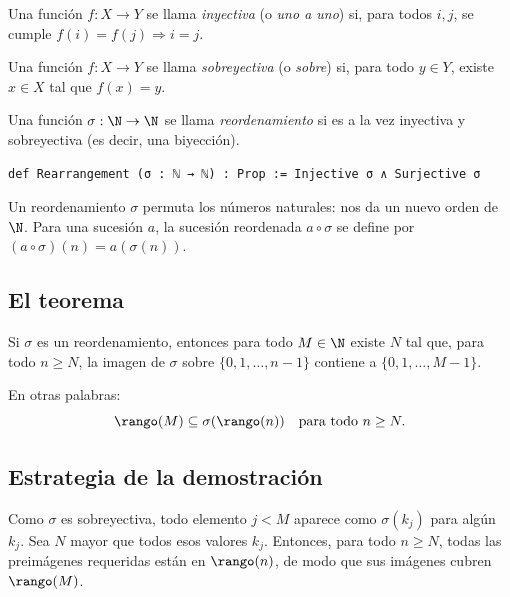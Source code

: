 \begin{definicion}[Inyectiva]
Una función $f : X \to Y$ se llama \emph{inyectiva} (o \emph{uno a uno}) si, para todos $i, j$, se cumple $f(i) = f(j) \Rightarrow i = j$.
\end{definicion}

\begin{definicion}[Sobreyectiva]
Una función $f : X \to Y$ se llama \emph{sobreyectiva} (o \emph{sobre}) si, para todo $y \in Y$, existe $x \in X$ tal que $f(x) = y$.
\end{definicion}

\begin{definicion}[Reordenamiento]
Una función $\sigma : \N \to \N$ se llama \emph{reordenamiento} si es a la vez inyectiva y sobreyectiva (es decir, una biyección).
\end{definicion}

\begin{verbatim}
def Rearrangement (σ : ℕ → ℕ) : Prop := Injective σ ∧ Surjective σ
\end{verbatim}

Un reordenamiento $\sigma$ permuta los números naturales: nos da un nuevo orden de $\N$. Para una sucesión $a$, la sucesión reordenada $a \circ \sigma$ se define por $(a \circ \sigma)(n) = a(\sigma(n))$.

\subsection{El teorema}

\begin{teorema}
Si $\sigma$ es un reordenamiento, entonces para todo $M \in \N$ existe $N$ tal que, para todo $n \ge N$, la imagen de $\sigma$ sobre $\{0, 1, \dots, n-1\}$ contiene a $\{0, 1, \dots, M-1\}$.
\end{teorema}

En otras palabras:
\[
  \rango(M) \subseteq \sigma(\rango(n)) \quad \text{para todo } n \ge N .
\]

\subsection{Estrategia de la demostración}

Como $\sigma$ es sobreyectiva, todo elemento $j < M$ aparece como $\sigma(k_j)$ para algún $k_j$. Sea $N$ mayor que todos esos valores $k_j$. Entonces, para todo $n \ge N$, todas las preimágenes requeridas están en $\rango(n)$, de modo que sus imágenes cubren $\rango(M)$.

